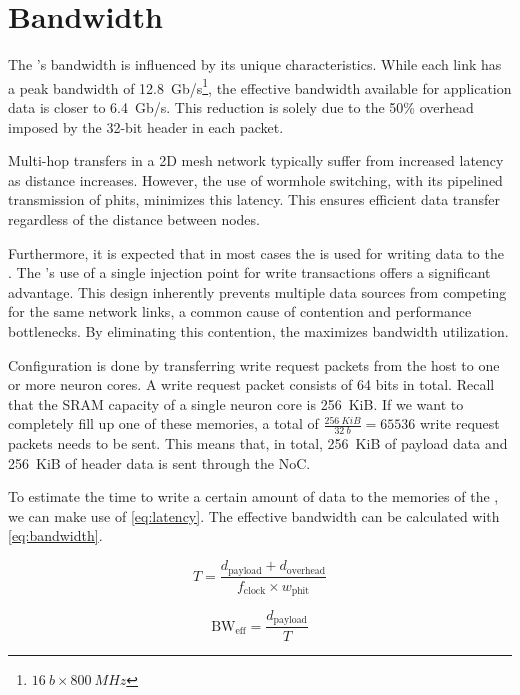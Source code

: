 \section{Bandwidth}
The \confignoc{}'s bandwidth is influenced by its unique characteristics.
While each link has a peak bandwidth of \SI{12.8}{Gb/s}\footnote{$\SI{16}{b} \times \SI{800}{MHz}$}, the effective bandwidth available for application data is closer to \SI{6.4}{Gb/s}.
This reduction is solely due to the 50\% overhead imposed by the 32-bit header in each packet.

Multi-hop transfers in a 2D mesh network typically suffer from increased latency as distance increases.
However, the use of wormhole switching, with its pipelined transmission of phits, minimizes this latency.
This ensures efficient data transfer regardless of the distance between nodes.

Furthermore, it is expected that in most cases the \confignoc{} is used for writing data to the \graicore{}.
The \confignoc{}'s use of a single injection point for write transactions offers a significant advantage.
This design inherently prevents multiple data sources from competing for the same network links, a common cause of contention and performance bottlenecks.
By eliminating this contention, the \confignoc{} maximizes bandwidth utilization.

Configuration is done by transferring write request packets from the host to one or more neuron cores.
A write request packet consists of 64 bits in total.
Recall that the SRAM capacity of a single neuron core is \SI{256}{KiB}.
If we want to completely fill up one of these memories, a total of $\frac{\SI{256}{KiB}}{\SI{32}{b}} = \num{65536}$ write request packets needs to be sent.
This means that, in total, \SI{256}{KiB} of payload data and \SI{256}{KiB} of header data is sent through the NoC.

To estimate the time to write a certain amount of data to the memories of the \graicore{}, we can make use of \cref{eq:latency}.
The effective bandwidth can be calculated with \cref{eq:bandwidth}.

\begin{equation} \label{eq:latency}
    T = 
    \frac{d_{\text{payload}} + d_{\text{overhead}}}
    {f_{\text{clock}} \times w_{\text{phit}}}
\end{equation}

\begin{equation} \label{eq:bandwidth}
    \text{BW}_{\text{eff}} =
    \frac{d_\text{payload}}{T}
\end{equation}

